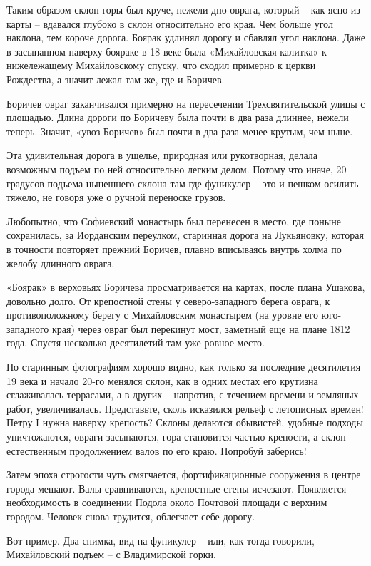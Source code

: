 Таким образом склон горы был круче, нежели дно оврага, который – как ясно из карты – вдавался глубоко в склон относительно его края. Чем больше угол наклона, тем короче дорога. Боярак удлинял дорогу и сбавлял угол наклона. Даже в засыпанном наверху бояраке в 18 веке была «Михайловская калитка» к нижележащему Михайловскому спуску, что сходил примерно к церкви Рождества, а значит лежал там же, где и Боричев.

Боричев овраг заканчивался примерно на пересечении Трехсвятительской улицы с площадью. Длина дороги по Боричеву была почти в два раза длиннее, нежели теперь. Значит, «увоз Боричев» был почти в два раза менее крутым, чем ныне.

Эта удивительная дорога в ущелье, природная или рукотворная, делала возможным подъем по ней относительно легким делом. Потому что иначе, 20 градусов подъема нынешнего склона там где фуникулер – это и пешком осилить тяжело, не говоря уже о ручной переноске грузов.

Любопытно, что Софиевский монастырь был перенесен в место, где поныне сохранилась, за Иорданским переулком, старинная дорога на Лукьяновку, которая в точности повторяет прежний Боричев, плавно вписываясь внутрь холма по желобу длинного оврага.

«Боярак» в верховьях Боричева просматривается на картах, после плана Ушакова, довольно долго. От крепостной стены у северо-западного берега оврага, к противоположному берегу с Михайловским монастырем (на уровне его юго-западного края) через овраг был перекинут мост, заметный еще на плане 1812 года. Спустя несколько десятилетий там уже ровное место.

По старинным фотографиям хорошо видно, как только за последние десятилетия 19 века и начало 20-го менялся склон, как в одних местах его крутизна сглаживалась террасами, а в других – напротив, с течением времени и земляных работ, увеличивалась. Представьте, сколь исказился рельеф с летописных времен! Петру I нужна наверху крепость? Склоны делаются обывистей, удобные подходы уничтожаются, овраги засыпаются, гора становится частью крепости, а склон естественным продолжением валов по его краю. Попробуй заберись! 

Затем эпоха строгости чуть смягчается, фортификационные сооружения в центре города мешают. Валы сравниваются, крепостные стены исчезают. Появляется необходимость в соединении Подола около Почтовой площади с верхним городом. Человек снова трудится, облегчает себе дорогу.

Вот пример. Два снимка, вид на фуникулер – или, как тогда говорили, Михайловский подъем – с Владимирской горки. 

